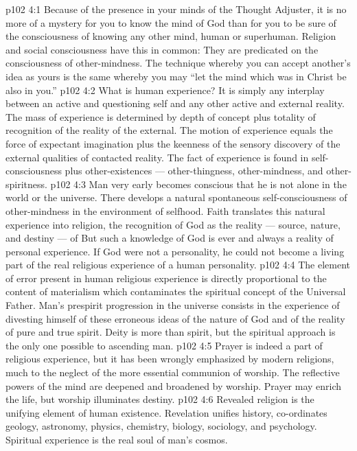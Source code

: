 \vs p102 4:1 Because of the presence in your minds of the Thought Adjuster, it is no more of a mystery for you to know the mind of God than for you to be sure of the consciousness of knowing any other mind, human or superhuman. Religion and social consciousness have this in common: They are predicated on the consciousness of other\hyp{}mindness. The technique whereby you can accept another’s idea as yours is the same whereby you may “let the mind which was in Christ be also in you.”
\vs p102 4:2 What is human experience? It is simply any interplay between an active and questioning self and any other active and external reality. The mass of experience is determined by depth of concept plus totality of recognition of the reality of the external. The motion of experience equals the force of expectant imagination plus the keenness of the sensory discovery of the external qualities of contacted reality. The fact of experience is found in self\hyp{}consciousness plus other\hyp{}existences --- other\hyp{}thingness, other\hyp{}mindness, and other\hyp{}spiritness.
\vs p102 4:3 Man very early becomes conscious that he is not alone in the world or the universe. There develops a natural spontaneous self\hyp{}consciousness of other\hyp{}mindness in the environment of selfhood. Faith translates this natural experience into religion, the recognition of God as the reality --- source, nature, and destiny --- of  But such a knowledge of God is ever and always a reality of personal experience. If God were not a personality, he could not become a living part of the real religious experience of a human personality.
\vs p102 4:4 The element of error present in human religious experience is directly proportional to the content of materialism which contaminates the spiritual concept of the Universal Father. Man’s prespirit progression in the universe consists in the experience of divesting himself of these erroneous ideas of the nature of God and of the reality of pure and true spirit. Deity is more than spirit, but the spiritual approach is the only one possible to ascending man.
\vs p102 4:5 \pc Prayer is indeed a part of religious experience, but it has been wrongly emphasized by modern religions, much to the neglect of the more essential communion of worship. The reflective powers of the mind are deepened and broadened by worship. Prayer may enrich the life, but worship illuminates destiny.
\vs p102 4:6 \pc Revealed religion is the unifying element of human existence. Revelation unifies history, co\hyp{}ordinates geology, astronomy, physics, chemistry, biology, sociology, and psychology. Spiritual experience is the real soul of man’s cosmos.
